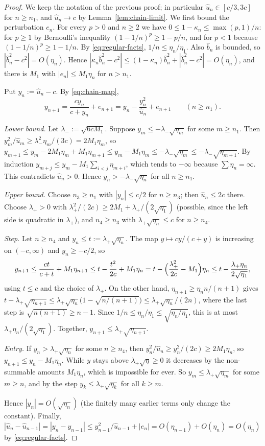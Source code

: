 \begin{proof}
We keep the notation of the previous proof; in particular $\hat u_n\in[c/3,3c]$ for $n\ge n_1$, and $\hat u_n\to c$ by
Lemma~\ref{lem:chain-limit}. We first bound the perturbation $e_n$. For every $p>0$ and $n\ge2$ we have
$0\le1-\kappa_n\le\max(p,1)/n$: for $p\ge1$ by Bernoulli's inequality $(1-1/n)^p\ge1-p/n$, and for $p<1$ because
$(1-1/n)^p\ge1-1/n$. By \eqref{eq:regular-facts}, $1/n\le\eta_n/\eta_1$. Also $\hat b_n$ is bounded, so
$|\hat b_n^2-c^2|=O(\eta_n)$. Hence $|\kappa_n\hat b_n^2-c^2|\le(1-\kappa_n)\hat b_n^2+|\hat b_n^2-c^2|=O(\eta_n)$, and there is
$M_1$ with $|e_n|\le M_1\eta_n$ for $n>n_1$.

Put $y_n:=\hat u_n-c$. By \eqref{eq:chain-map},
\[
  y_{n+1}=\frac{cy_n}{c+y_n}+e_{n+1}=y_n-\frac{y_n^2}{\hat u_n}+e_{n+1}\qquad(n\ge n_1).
\]

\emph{Lower bound.} Let $\lambda_-:=\sqrt{6cM_1}$. Suppose $y_m\le-\lambda_-\sqrt{\eta_m}$ for some $m\ge n_1$. Then
$y_m^2/\hat u_m\ge\lambda_-^2\eta_m/(3c)=2M_1\eta_m$, so
$y_{m+1}\le y_m-2M_1\eta_m+M_1\eta_{m+1}\le y_m-M_1\eta_m\le-\lambda_-\sqrt{\eta_m}\le-\lambda_-\sqrt{\eta_{m+1}}$. By
induction $y_{m+j}\le y_m-M_1\sum_{i<j}\eta_{m+i}$, which tends to $-\infty$ because $\sum\eta_n=\infty$. This
contradicts $\hat u_n>0$. Hence $y_n>-\lambda_-\sqrt{\eta_n}$ for all $n\ge n_1$.

\emph{Upper bound.} Choose $n_3\ge n_1$ with $|y_n|\le c/2$ for $n\ge n_3$; then $\hat u_n\le2c$ there. Choose
$\lambda_+>0$ with $\lambda_+^2/(2c)\ge2M_1+\lambda_+/(2\sqrt{\eta_1})$ (possible, since the left side is quadratic in
$\lambda_+$), and $n_4\ge n_3$ with $\lambda_+\sqrt{\eta_n}\le c$ for $n\ge n_4$.

\emph{Step.} Let $n\ge n_4$ and $y_n\le t:=\lambda_+\sqrt{\eta_n}$. The map $y\mapsto cy/(c+y)$ is increasing on
$(-c,\infty)$ and $y_n\ge-c/2$, so
\[
  y_{n+1}\le\frac{ct}{c+t}+M_1\eta_{n+1}\le t-\frac{t^2}{2c}+M_1\eta_n
  =t-\Bigl(\frac{\lambda_+^2}{2c}-M_1\Bigr)\eta_n\le t-\frac{\lambda_+\eta_n}{2\sqrt{\eta_1}},
\]
using $t\le c$ and the choice of $\lambda_+$. On the other hand, $\eta_{n+1}\ge\eta_nn/(n+1)$ gives
$t-\lambda_+\sqrt{\eta_{n+1}}\le\lambda_+\sqrt{\eta_n}\bigl(1-\sqrt{n/(n+1)}\bigr)\le\lambda_+\sqrt{\eta_n}/(2n)$, where the last
step is $\sqrt{n(n+1)}\ge n-1$. Since $1/n\le\eta_n/\eta_1\le\sqrt{\eta_n/\eta_1}$, this is at most
$\lambda_+\eta_n/(2\sqrt{\eta_1})$. Together, $y_{n+1}\le\lambda_+\sqrt{\eta_{n+1}}$.

\emph{Entry.} If $y_n>\lambda_+\sqrt{\eta_n}$ for some $n\ge n_4$, then $y_n^2/\hat u_n\ge y_n^2/(2c)\ge2M_1\eta_n$, so
$y_{n+1}\le y_n-M_1\eta_n$. While $y$ stays above $\lambda_+\sqrt{\eta}\ge0$ it decreases by the non-summable amounts
$M_1\eta_n$, which is impossible for ever. So $y_m\le\lambda_+\sqrt{\eta_m}$ for some $m\ge n$, and by the step
$y_k\le\lambda_+\sqrt{\eta_k}$ for all $k\ge m$.

Hence $|y_n|=O(\sqrt{\eta_n})$ (the finitely many earlier terms only change the constant). Finally,
$|\hat u_n-\hat u_{n-1}|=|y_n-y_{n-1}|\le y_{n-1}^2/\hat u_{n-1}+|e_n|=O(\eta_{n-1})+O(\eta_n)=O(\eta_n)$ by
\eqref{eq:regular-facts}.
\end{proof}


